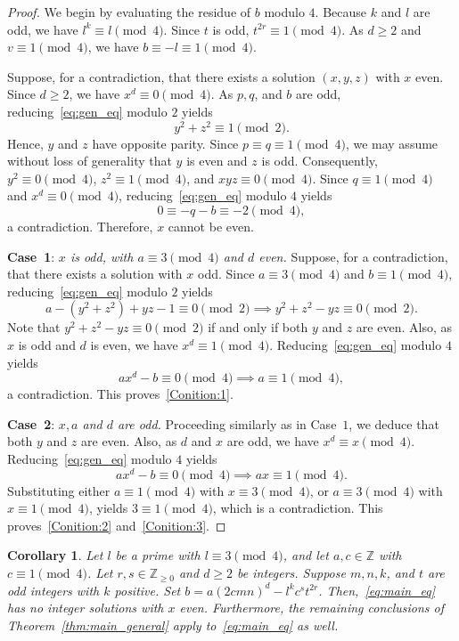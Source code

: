 \documentclass[11pt,a4paper]{amsart}
\newcommand{\ZZ}{\mathbb{Z}}
\theoremstyle{plain}
\newtheorem{corollary}[theorem]{Corollary}
\theoremstyle{definition}
\begin{document}
\begin{proof}
We begin by evaluating the residue of $b$ modulo $4$. Because $k$ and $l$ are odd, we have $l^k \equiv l \pmod 4$. Since $t$ is odd, $t^{2r} \equiv 1 \pmod 4$. As $d \ge 2$ and $v \equiv 1 \pmod 4$, we have $b \equiv -l \equiv 1 \pmod 4$.

Suppose, for a contradiction, that there exists a solution $(x,y,z)$ with $x$ even. Since $d \ge 2$, we have $x^d \equiv 0 \pmod 4$. As $p, q$, and $b$ are odd, reducing~\eqref{eq:gen_eq} modulo $2$ yields
\[
 y^2 + z^2 \equiv 1 \pmod 2.
\]
Hence, $y$ and $z$ have opposite parity. Since $p \equiv q \equiv 1 \pmod 4$, we may assume without loss of generality that $y$ is even and $z$ is odd. Consequently, $y^2 \equiv 0 \pmod 4$, $z^2 \equiv 1 \pmod 4$, and $xyz \equiv 0 \pmod 4$. Since $q \equiv 1 \pmod 4$ and $x^d \equiv 0 \pmod 4$, reducing~\eqref{eq:gen_eq} modulo $4$ yields
\[
 0 \equiv -q - b \equiv -2 \pmod 4,
\]
a contradiction. Therefore, $x$ cannot be even.

\medskip
\noindent\textbf{Case~1}: \textit{$x$ is odd, with $a \equiv 3 \pmod 4$ and $d$ even.} Suppose, for a contradiction, that there exists a solution with $x$ odd. Since $a \equiv 3 \pmod 4$ and $b \equiv 1 \pmod{4}$, reducing~\eqref{eq:gen_eq} modulo $2$ yields 
\[
  a - (y^2 + z^2) + yz - 1 \equiv 0 \pmod 2 \implies y^2 + z^2 - yz \equiv 0 \pmod 2.
\]
Note that $y^2 + z^2 - yz\equiv 0 \pmod 2$ if and only if both $y$ and $z$ are even. Also, as $x$ is odd and $d$ is even, we have $x^d \equiv 1 \pmod 4$. Reducing~\eqref{eq:gen_eq} modulo $4$ yields 
\[
  ax^d  - b \equiv 0 \pmod 4 \implies a \equiv 1 \pmod 4,
\]
a contradiction. This proves~\ref{Conition:1}.

\medskip
\noindent\textbf{Case~2}: \textit{$x,a$  and $d$ are odd.}
Proceeding similarly as in Case~$1$, we deduce that both $y$ and $z$ are even. Also, as $d$ and $x$ are odd, we have $x^d \equiv x \pmod 4$. Reducing~\eqref{eq:gen_eq} modulo $4$ yields 
\[
 ax^d - b \equiv 0 \pmod 4 \implies ax \equiv 1 \pmod 4.
\]
Substituting either $a \equiv 1 \pmod 4$ with $x \equiv 3 \pmod 4$, or $a \equiv 3 \pmod 4$ with $x \equiv 1 \pmod 4$, yields $3 \equiv 1 \pmod 4$, which is a contradiction.  This proves~\ref{Conition:2} and~\ref{Conition:3}. 
\end{proof}
\begin{corollary}\label{thm:no_sol_general2}
Let $l$ be a prime with $l \equiv 3 \pmod 4$, and let $a,c \in \ZZ$ with $c \equiv 1 \pmod 4$. Let $r,s \in \ZZ_{\ge 0}$ and $d \ge 2$ be integers. Suppose $m, n, k$, and $t$ are odd integers with $k$ positive. Set $b = a(2cmn)^{d} - l^{k}c^{s}t^{2r}$. Then,~\eqref{eq:main_eq} has no integer solutions with $x$ even. Furthermore, the remaining conclusions of Theorem~\ref{thm:main_general} apply to~\eqref{eq:main_eq} as well.
\end{corollary}
\end{document}
